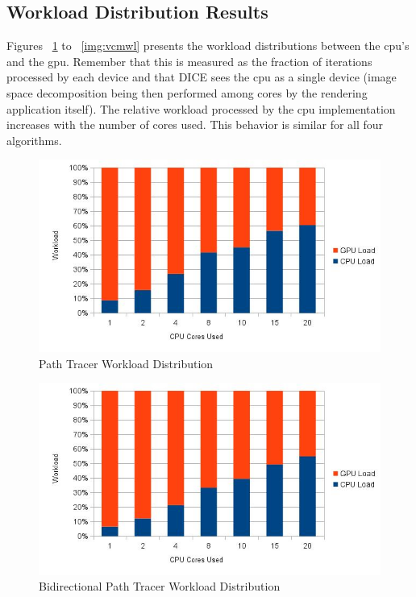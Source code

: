\subsection{Workload Distribution Results}

Figures ~\ref{img:ptwl} to ~\ref{img:vcmwl} presents the workload distributions between the \gls{cpu}'s and the \gls{gpu}.  Remember that this is measured as the fraction of iterations processed by each device and that DICE sees the \gls{cpu} as a single device (image space decomposition being then performed among cores by the rendering application itself). The relative workload processed by the \gls{cpu} implementation increases with the number of cores used. This behavior is similar for all four algorithms.

\begin{figure}[H]
\centering
\includegraphics[width=0.8\linewidth]{img/ptwl.jpg}
\caption{\label{img:ptwl} Path Tracer Workload Distribution}
\end{figure}

\begin{figure}[H]
\centering
\includegraphics[width=0.8\linewidth]{img/bptwl.jpg}
\caption{\label{img:bptwl} Bidirectional Path Tracer Workload Distribution}
\end{figure}

